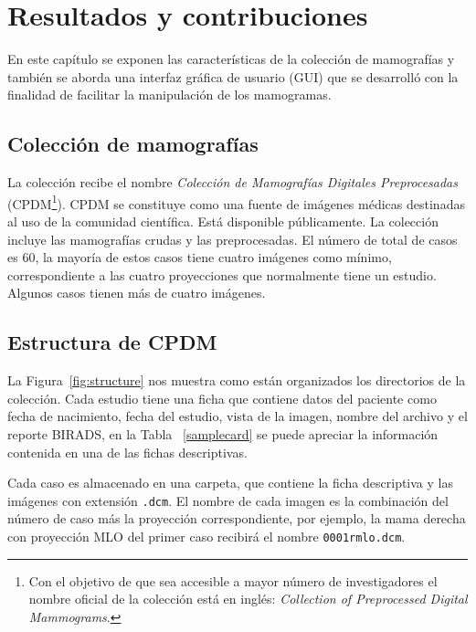 \chapter{Resultados y contribuciones}
\label{resultados}

En este capítulo se exponen las características de la colección de mamografías
y también se aborda una interfaz gráfica de usuario (GUI) que se desarrolló con
la finalidad de facilitar la manipulación de los mamogramas.

\section{Colección de mamografías}

La colección recibe el nombre \textit{Colección de Mamografías Digitales
Preprocesadas} (CPDM\footnote{Con el objetivo de que sea accesible a mayor
número de investigadores el nombre oficial de la colección está en inglés:
\textit{Collection of Preprocessed Digital Mammograms}.}). CPDM se constituye
como una fuente de imágenes médicas destinadas al uso de la comunidad
científica. Está disponible públicamente. La colección incluye las mamografías
crudas y las preprocesadas. El número de total de casos es 60, la mayoría de
estos casos tiene cuatro imágenes como mínimo, correspondiente a las cuatro
proyecciones que normalmente tiene un estudio. Algunos casos tienen más de
cuatro imágenes.

\section{Estructura de CPDM}

La Figura~\ref{fig:structure} nos muestra como están organizados los
directorios de la colección. Cada estudio tiene una ficha que contiene datos
del paciente como fecha de nacimiento, fecha del estudio, vista de la imagen,
nombre del archivo y el reporte BIRADS, en la Tabla ~\ref{samplecard} se puede
apreciar la información contenida en una de las fichas descriptivas. 

Cada caso es almacenado en una carpeta, que contiene la ficha descriptiva y las
imágenes con extensión \texttt{.dcm}. El nombre de cada imagen es la
combinación del número de caso más la proyección correspondiente, por ejemplo,
la mama derecha con proyección MLO del primer caso recibirá el nombre
\texttt{0001rmlo.dcm}.

